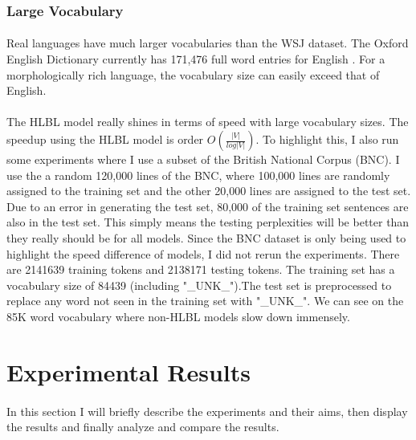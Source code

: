 \subsubsection{Large Vocabulary}
\paragraph{}
Real languages have much larger vocabularies than the WSJ dataset. The Oxford English Dictionary currently has 171,476 full word entries for English \cite{OED}. For a morphologically rich language, the vocabulary size can easily exceed that of English.
\paragraph{}
The HLBL model really shines in terms of speed with large vocabulary sizes. The speedup using the HLBL model is order $O(\frac{|V|}{log|V|})$. To highlight this, I also run some experiments where I use a subset of the British National Corpus (BNC). I use the a random 120,000 lines of the BNC, where 100,000 lines are randomly assigned to the training set and the other 20,000 lines are assigned to the test set. Due to an error in generating the test set, 80,000 of the training set sentences are also in the test set. This simply means the testing perplexities will be better than they really should be for all models. Since the BNC dataset is only being used to highlight the speed difference of models, I did not rerun the experiments. There are 2141639 training tokens and 2138171 testing tokens. The training set has a vocabulary size of 84439 (including "\_UNK\_").The test set is preprocessed to replace any word not seen in the training set with "\_UNK\_". We can see on the 85K word vocabulary where non-HLBL models slow down immensely.




\section{Experimental Results}
\paragraph{}
In this section I will briefly describe the experiments and their aims, then display the results and finally analyze and compare the results.

